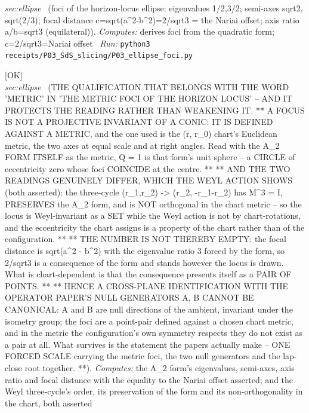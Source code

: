 \begin{description}
\textit{sec:ellipse} \ (foci of the horizon-locus ellipse: eigenvalues 1/2,3/2; semi-axes sqrt2, sqrt(2/3); focal distance c=sqrt(a\textasciicircum{}2-b\textasciicircum{}2)=2/sqrt3 = the Nariai offset; axis ratio a/b=sqrt3 (equilateral)). 
\emph{Computes:} derives foci from the quadratic form; c=2/sqrt3=Nariai offset
\ \emph{Run:} \texttt{python3 receipts/P03\_SdS\_slicing/P03\_ellipse\_foci.py}
\item[\rcptlabel{P03_the_foci_are_chart_objects}{P3R20}\textbf{P3R20}\quad\texttt{P03\_the\_foci\_are\_chart\_objects}]\hfill\textsf{[OK]}\\
\textit{sec:ellipse} \ (THE QUALIFICATION THAT BELONGS WITH THE WORD 'METRIC' IN 'THE METRIC FOCI OF THE HORIZON LOCUS' -- AND IT PROTECTS THE READING RATHER THAN WEAKENING IT. ** A FOCUS IS NOT A PROJECTIVE INVARIANT OF A CONIC: IT IS DEFINED AGAINST A METRIC, and the one used is the (r, r\_0) chart's Euclidean metric, the two axes at equal scale and at right angles. Read with the A\_2 FORM ITSELF as the metric, Q = 1 is that form's unit sphere -- a CIRCLE of eccentricity zero whose foci COINCIDE at the centre. ** ** AND THE TWO READINGS GENUINELY DIFFER, WHICH THE WEYL ACTION SHOWS (both asserted): the three-cycle (r\_1,r\_2) -> (r\_2, -r\_1-r\_2) has M\textasciicircum{}3 = I, PRESERVES the A\_2 form, and is NOT orthogonal in the chart metric -- so the locus is Weyl-invariant as a SET while the Weyl action is not by chart-rotations, and the eccentricity the chart assigns is a property of the chart rather than of the configuration. ** ** THE NUMBER IS NOT THEREBY EMPTY: the focal distance is sqrt(a\textasciicircum{}2 - b\textasciicircum{}2) with the eigenvalue ratio 3 forced by the form, so 2/sqrt3 is a consequence of the form and stands however the locus is drawn. What is chart-dependent is that the consequence presents itself as a PAIR OF POINTS. ** ** HENCE A CROSS-PLANE IDENTIFICATION WITH THE OPERATOR PAPER'S NULL GENERATORS A, B CANNOT BE CANONICAL: A and B are null directions of the ambient, invariant under the isometry group; the foci are a point-pair defined against a chosen chart metric, and in the metric the configuration's own symmetry respects they do not exist as a pair at all. What survives is the statement the papers actually make -- ONE FORCED SCALE carrying the metric foci, the two null generators and the lap-close root together. **). 
\emph{Computes:} the A\_2 form's eigenvalues, semi-axes, axis ratio and focal distance with the equality to the Nariai offset asserted; and the Weyl three-cycle's order, its preservation of the form and its non-orthogonality in the chart, both asserted

\end{description}
